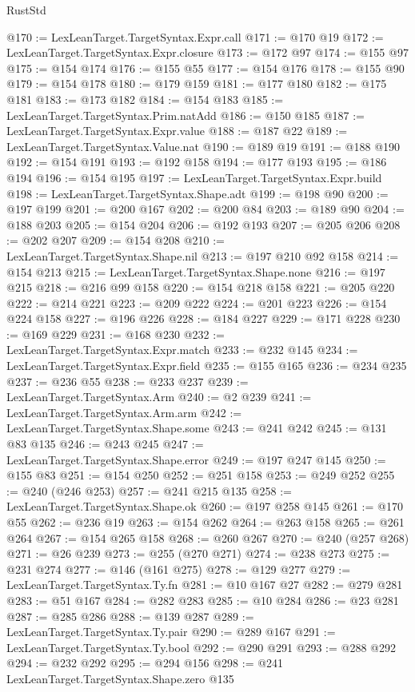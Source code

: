 \begin{lexlean}{RustStd}
\begin{coremodule}
{\begin{coremodule}
{{{{{{{{{{{{{{{{{{{{{{{{{{{{{{{{{{{{{{{@170 := LexLeanTarget.TargetSyntax.Expr.call
@171 := @170 @19
@172 := LexLeanTarget.TargetSyntax.Expr.closure
@173 := @172 @97
@174 := @155 @97
@175 := @154 @174
@176 := @155 @55
@177 := @154 @176
@178 := @155 @90
@179 := @154 @178
@180 := @179 @159
@181 := @177 @180
@182 := @175 @181
@183 := @173 @182
@184 := @154 @183
@185 := LexLeanTarget.TargetSyntax.Prim.natAdd
@186 := @150 @185
@187 := LexLeanTarget.TargetSyntax.Expr.value
@188 := @187 @22
@189 := LexLeanTarget.TargetSyntax.Value.nat
@190 := @189 @19
@191 := @188 @190
@192 := @154 @191
@193 := @192 @158
@194 := @177 @193
@195 := @186 @194
@196 := @154 @195
@197 := LexLeanTarget.TargetSyntax.Expr.build
@198 := LexLeanTarget.TargetSyntax.Shape.adt
@199 := @198 @90
@200 := @197 @199
@201 := @200 @167
@202 := @200 @84
@203 := @189 @90
@204 := @188 @203
@205 := @154 @204
@206 := @192 @193
@207 := @205 @206
@208 := @202 @207
@209 := @154 @208
@210 := LexLeanTarget.TargetSyntax.Shape.nil
@213 := @197 @210 @92 @158
@214 := @154 @213
@215 := LexLeanTarget.TargetSyntax.Shape.none
@216 := @197 @215
@218 := @216 @99 @158
@220 := @154 @218 @158
@221 := @205 @220
@222 := @214 @221
@223 := @209 @222
@224 := @201 @223
@226 := @154 @224 @158
@227 := @196 @226
@228 := @184 @227
@229 := @171 @228
@230 := @169 @229
@231 := @168 @230
@232 := LexLeanTarget.TargetSyntax.Expr.match
@233 := @232 @145
@234 := LexLeanTarget.TargetSyntax.Expr.field
@235 := @155 @165
@236 := @234 @235
@237 := @236 @55
@238 := @233 @237
@239 := LexLeanTarget.TargetSyntax.Arm
@240 := @2 @239
@241 := LexLeanTarget.TargetSyntax.Arm.arm
@242 := LexLeanTarget.TargetSyntax.Shape.some
@243 := @241 @242
@245 := @131 @83 @135
@246 := @243 @245
@247 := LexLeanTarget.TargetSyntax.Shape.error
@249 := @197 @247 @145
@250 := @155 @83
@251 := @154 @250
@252 := @251 @158
@253 := @249 @252
@255 := @240 (@246 @253)
@257 := @241 @215 @135
@258 := LexLeanTarget.TargetSyntax.Shape.ok
@260 := @197 @258 @145
@261 := @170 @55
@262 := @236 @19
@263 := @154 @262
@264 := @263 @158
@265 := @261 @264
@267 := @154 @265 @158
@268 := @260 @267
@270 := @240 (@257 @268)
@271 := @26 @239
@273 := @255 (@270 @271)
@274 := @238 @273
@275 := @231 @274
@277 := @146 (@161 @275)
@278 := @129 @277
@279 := LexLeanTarget.TargetSyntax.Ty.fn
@281 := @10 @167 @27
@282 := @279 @281
@283 := @51 @167
@284 := @282 @283
@285 := @10 @284
@286 := @23 @281
@287 := @285 @286
@288 := @139 @287
@289 := LexLeanTarget.TargetSyntax.Ty.pair
@290 := @289 @167
@291 := LexLeanTarget.TargetSyntax.Ty.bool
@292 := @290 @291
@293 := @288 @292
@294 := @232 @292
@295 := @294 @156
@298 := @241 LexLeanTarget.TargetSyntax.Shape.zero @135
}}}}}}}}}}}}}}}}}}}}}}}}}}}}}}}}}}}}}}}
\end{coremodule}}
\end{coremodule}
\end{lexlean}
